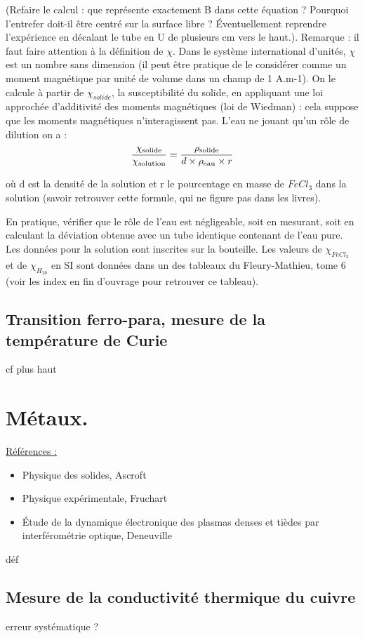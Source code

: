 \documentclass{article}%
\begin{document}
(Refaire le calcul : que représente exactement B dans cette équation ? Pourquoi l'entrefer doit-il être centré sur la surface libre ? Éventuellement reprendre l'expérience en décalant le tube en U de plusieurs cm vers le haut.).
Remarque : il faut faire attention à la définition de $\chi$. Dans le système international d'unités, $\chi$ est un nombre sans dimension (il peut être pratique de le considérer comme un moment magnétique par unité de volume dans un champ de 1 A.m-1). On le calcule à partir de $\chi_{solide}$, la susceptibilité du solide, en appliquant une loi approchée d'additivité des moments magnétiques (loi de Wiedman) : cela suppose que les moments magnétiques n'interagissent pas. L'eau ne jouant qu'un rôle de dilution on a :
\[ \frac{\chi_{\rm solide}}{\chi_{\rm solution}}= \frac{\rho_{\rm solide}}{d\times \rho_{\rm eau} \times r}\]

où d est la densité de la solution et r le pourcentage en masse de $FeCl_3$ dans la solution (savoir retrouver cette formule, qui ne figure pas dans les livres).

En pratique, vérifier que le rôle de l'eau est négligeable, soit en mesurant, soit en calculant la déviation obtenue avec un tube identique contenant de l'eau pure. Les données pour la solution sont inscrites sur la bouteille. Les valeurs de $\chi_{FeCl_3}$ et de $\chi_{H_20}$ en SI sont données dans un des tableaux du Fleury-Mathieu, tome 6 (voir les index en fin d'ouvrage pour retrouver ce tableau).

\subsection{Transition ferro-para, mesure de la température de Curie}
cf plus haut
\section{Métaux.}
\underline{Références :}
\begin{itemize}
	\item Physique des solides, Ascroft
	\item Physique expérimentale, Fruchart
	\item Étude de la dynamique électronique des plasmas denses et tièdes par interférométrie optique, Deneuville
\end{itemize}

déf
\subsection{Mesure de la conductivité thermique du cuivre}
erreur systématique ?
\end{document}
